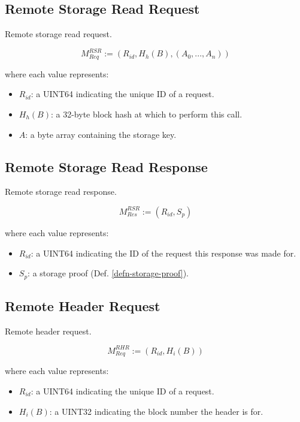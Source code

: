 \documentclass{book}
\begin{document}
\subsection{Remote Storage Read Request}

Remote storage read request.

\[
    M^{RSR}_{Req} := (R_{id}, H_h(B), (A_0, ..., A_n))
\]

where each value represents:

\begin{itemize}
    \item $R_{id}$: a UINT64 indicating the unique ID of a request.
    \item $H_h(B)$: a 32-byte block hash at which to perform this call.
    \item $A$: a byte array containing the storage key.
\end{itemize}

\subsection{Remote Storage Read Response}

Remote storage read response.

\[
    M^{RSR}_{Res} := (R_{id}, S_p)
\]

where each value represents:

\begin{itemize}
    \item $R_{id}$: a UINT64 indicating the ID of the request this response was
    made for.
    \item $S_p$: a storage proof (Def. \ref{defn-storage-proof}).
\end{itemize}

\subsection{Remote Header Request}

Remote header request.

\[
    M^{RHR}_{Req} := (R_{id}, H_i(B))
\]

where each value represents:

\begin{itemize}
    \item $R_{id}$: a UINT64 indicating the unique ID of a request.
    \item $H_i(B)$: a UINT32 indicating the block number the header is for.
\end{itemize}
\end{document}
